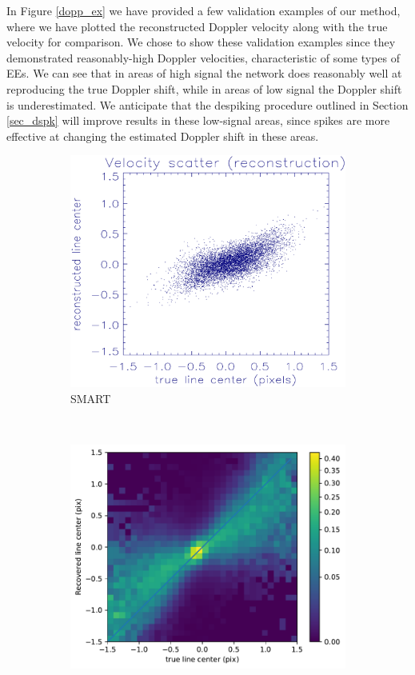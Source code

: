 \documentclass[10pt,letterpaper]{article}
\newcommand{\EEs}{\acp{EE}}
\begin{document}
			In Figure \ref{dopp_ex} we have provided a few validation examples of our method, where we have plotted the reconstructed Doppler velocity along with the true velocity for comparison. 
			We chose to show these validation examples since they demonstrated reasonably-high Doppler velocities, characteristic of some types of \EEs.
			We can see that in areas of high signal the network does reasonably well at reproducing the true Doppler shift, while in areas of low signal the Doppler shift is underestimated.
			We anticipate that the despiking procedure outlined in Section \ref{sec_dspk} will improve results in these low-signal areas, since spikes are more effective at changing the estimated Doppler shift in these areas.
			
			\begin{figure}[t!]
				\centering
				\begin{subfigure}[t]{0.5\textwidth}
					\centering
					\includegraphics[width=\textwidth]{fig/smart_hist}
					\caption{SMART}
					\label{smart_hist}
				\end{subfigure}%
				~ 
				\begin{subfigure}[t]{0.5\textwidth}
					\centering	
					\includegraphics[width=\textwidth]{fig/linearity}

\end{subfigure}
\end{figure}
\end{document}
